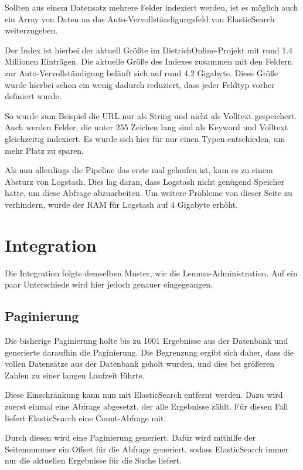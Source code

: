 Sollten aus einem Datensatz mehrere Felder indexiert werden, ist es möglich auch ein Array von Daten an das Auto-Vervollständigungsfeld von ElasticSearch weiterzugeben.

Der Index ist hierbei der aktuell Größte im DietrichOnline-Projekt mit rund 1.4 Millionen Einträgen. Die aktuelle Größe des Indexes zusammen mit den Feldern zur Auto-Vervollständigung beläuft sich auf rund 4.2 Gigabyte. 
Diese Größe wurde hierbei schon ein wenig dadurch reduziert, dass jeder Feldtyp vorher definiert wurde.

So wurde zum Beispiel die URL nur als String und nicht als Volltext gespeichert. Auch werden Felder, die unter 255 Zeichen lang sind als Keyword und Volltext gleichzeitig indexiert. Es wurde sich hier für nur einen Typen entschieden, um mehr Platz zu sparen.

Als nun allerdings die Pipeline das erste mal gelaufen ist, kam es zu einem Absturz von Logstash. Dies lag daran, dass Logstash nicht genügend Speicher hatte, um diese Abfrage abzuarbeiten. Um weitere Probleme von dieser Seite zu verhindern, wurde der RAM für Logstash auf 4 Gigabyte erhöht.

\section{Integration}

Die Integration folgte demselben Muster, wie die Lemma-Administration. Auf ein paar Unterschiede wird hier jedoch genauer eingegeangen. 

\subsection{Paginierung}

Die bisherige Paginierung holte bis zu 1001 Ergebnisse aus der Datenbank und generierte daraufhin die Paginierung. Die Begrenzung ergibt sich daher, dass die vollen Datensätze aus der Datenbank geholt wurden, und dies bei größeren Zahlen zu einer langen Laufzeit führte.

Diese Einschränkung kann nun mit ElasticSearch entfernt werden. Dazu wird zuerst einmal eine Abfrage abgesetzt, der alle Ergebnisse zählt. Für diesen Fall liefert ElasticSearch eine Count-Abfrage mit.

Durch diesen wird eine Paginierung generiert. Dafür wird mithilfe der Seitennummer ein Offset für die Abfrage generiert, sodass ElasticSearch immer nur die aktuellen Ergebnisse für die Suche liefert.

